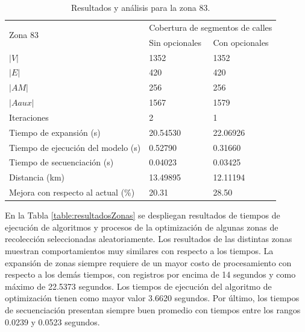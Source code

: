 \begin{table}[htbp]
\caption{Resultados y análisis para la zona 83.}
\begin{tabular}{lll}
\hline
\multirow{2}{*}{Zona 83}                            & \multicolumn{2}{l}{Cobertura de segmentos de calles} \\ \cline{2-3} 
                                                    & Sin opcionales           & Con opcionales           \\ \hline
$|V|$                                                   & 1352                     & 1352                     \\
$|E|$                                                   & 420                      & 420                      \\
$|AM|$                                                  & 256                      & 256                      \\
$|Aaux|$                                                & 1567                     & 1579                     \\
Iteraciones                                         & 2                        & 1                        \\
Tiempo de expansión (s)                      & 20.54530                 & 22.06926                 \\ 
Tiempo de ejecución del modelo (s)            & 0.52790                  & 0.31660                  \\ 
Tiempo de secuenciación (s)                  & 0.04023                  & 0.03425                  \\ 
Distancia (km)                                      & 13.49895                 & 12.11194                 \\ 
Mejora con respecto al actual (\%) & 20.31                    & 28.50                    \\ \hline
\end{tabular}
\label{table:comparacionZona83}
\end{table}

En la Tabla \ref{table:resultadosZonas} se despliegan resultados de tiempos de ejecución de algoritmos y procesos de la optimización de algunas zonas de recolección seleccionadas aleatoriamente. Los resultados de las distintas zonas muestran comportamientos muy similares con respecto a los tiempos. La expansión de zonas siempre requiere de un mayor costo de procesamiento con respecto a los demás tiempos, con registros por encima de 14 segundos y como máximo de 22.5373 segundos. Los tiempos de ejecución del algoritmo de optimización tienen como mayor valor 3.6620 segundos. Por último, los tiempos de secuenciación presentan siempre buen promedio con tiempos entre los rangos 0.0239 y 0.0523 segundos.

